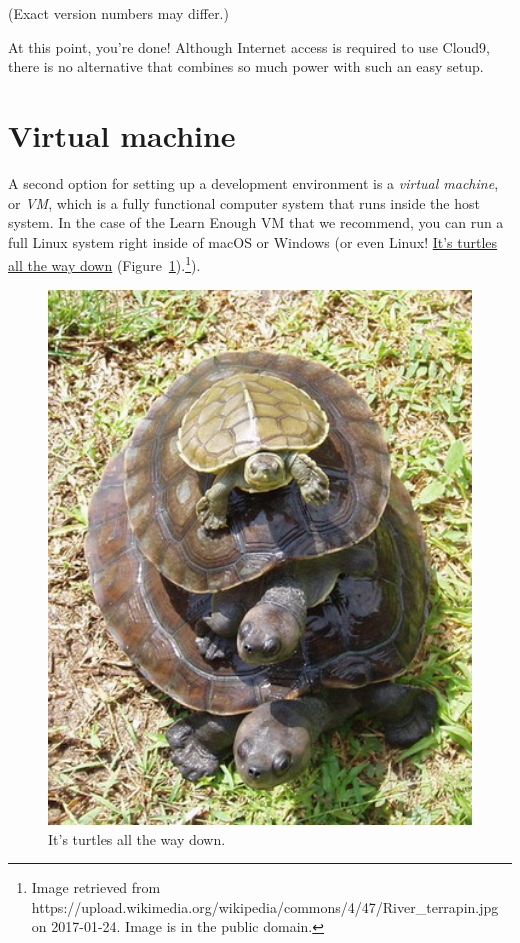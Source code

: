 \noindent (Exact version numbers may differ.)

At this point, you're done! Although Internet access is required to use Cloud9, there is no alternative that combines so much power with such an easy setup.


\section{Virtual machine} %
\label{sec:virtual_machine}

A second option for setting up a development environment is a \emph{virtual machine}, or \emph{VM}, which is a fully functional computer system that runs inside the host system. In the case of the Learn Enough VM that we recommend, you can run a full Linux system right inside of macOS or Windows (or even Linux! \href{https://en.wikipedia.org/wiki/Turtles_all_the_way_down}{It's turtles all the way down} (Figure~\ref{fig:turtles}).\footnote{Image retrieved from https://upload.wikimedia.org/wikipedia/commons/4/47/River\_terrapin.jpg on 2017-01-24. Image is in the public domain.}).

\begin{figure}
\begin{center}
\includegraphics[width=5.5in]{images/figures/turtles.jpg}
\end{center}
\caption{It's turtles all the way down.\label{fig:turtles}}
\end{figure}


